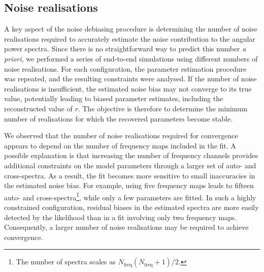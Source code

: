 \documentclass[../../thesis.tex]{subfiles}
\begin{document}
\subsection{Noise realisations}

A key aspect of the noise debiasing procedure is determining the number of noise realisations required to accurately estimate the noise contribution to the angular power spectra. Since there is no straightforward way to predict this number \emph{a priori}, we performed a series of end-to-end simulations using different numbers of noise realisations. For each configuration, the parameter estimation procedure was repeated, and the resulting constraints were analysed.
If the number of noise realisations is insufficient, the estimated noise bias may not converge to its true value, potentially leading to biased parameter estimates, including the reconstructed value of $r$. The objective is therefore to determine the minimum number of realisations for which the recovered parameters become stable.

We observed that the number of noise realisations required for convergence appears to depend on the number of frequency maps included in the fit. A possible explanation is that increasing the number of frequency channels provides additional constraints on the model parameters through a larger set of auto- and cross-spectra. As a result, the fit becomes more sensitive to small inaccuracies in the estimated noise bias. For example, using five frequency maps leads to fifteen auto- and cross-spectra\footnote{The number of spectra scales as $N_{\mathrm{freq}}(N_{\mathrm{freq}}+1)/2$.}, while only a few parameters are fitted. In such a highly constrained configuration, residual biases in the estimated spectra are more easily detected by the likelihood than in a fit involving only two frequency maps. Consequently, a larger number of noise realisations may be required to achieve convergence.
\end{document}

